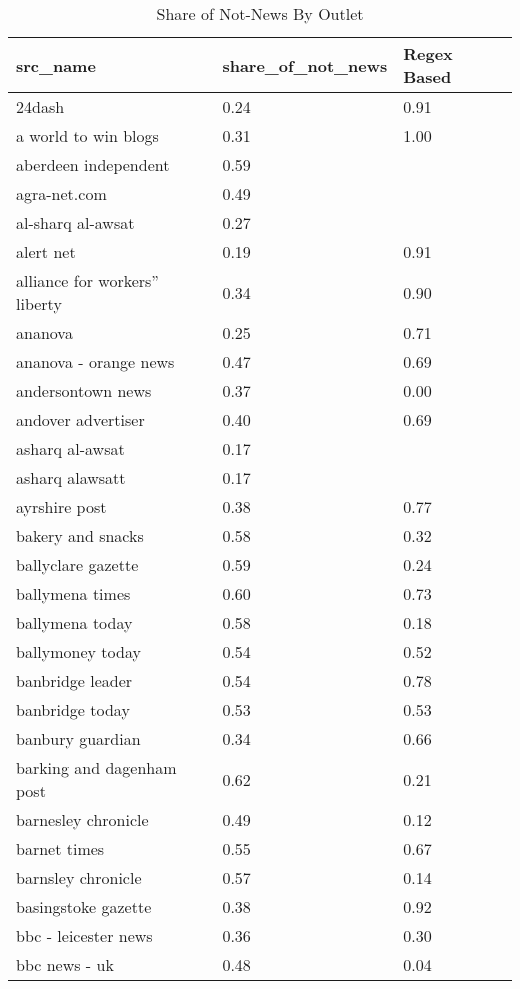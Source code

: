 \begingroup\tiny
\begin{longtable}{p{}p{}p{}}
\caption{Share of Not-News By Outlet} \\ 
  \hline
src_name & share_of_not_news & Regex Based \\ 
  \hline
24dash & 0.24 & 0.91 \\ 
  a world to win blogs & 0.31 & 1.00 \\ 
  aberdeen independent & 0.59 &  \\ 
  agra-net.com & 0.49 &  \\ 
  al-sharq al-awsat & 0.27 &  \\ 
  alert net & 0.19 & 0.91 \\ 
  alliance for workers'' liberty & 0.34 & 0.90 \\ 
  ananova & 0.25 & 0.71 \\ 
  ananova - orange news & 0.47 & 0.69 \\ 
  andersontown news & 0.37 & 0.00 \\ 
  andover advertiser & 0.40 & 0.69 \\ 
  asharq al-awsat & 0.17 &  \\ 
  asharq alawsatt & 0.17 &  \\ 
  ayrshire post & 0.38 & 0.77 \\ 
  bakery and snacks & 0.58 & 0.32 \\ 
  ballyclare gazette & 0.59 & 0.24 \\ 
  ballymena times & 0.60 & 0.73 \\ 
  ballymena today & 0.58 & 0.18 \\ 
  ballymoney today & 0.54 & 0.52 \\ 
  banbridge leader & 0.54 & 0.78 \\ 
  banbridge today & 0.53 & 0.53 \\ 
  banbury guardian & 0.34 & 0.66 \\ 
  barking and dagenham post & 0.62 & 0.21 \\ 
  barnesley chronicle & 0.49 & 0.12 \\ 
  barnet times & 0.55 & 0.67 \\ 
  barnsley chronicle & 0.57 & 0.14 \\ 
  basingstoke gazette & 0.38 & 0.92 \\ 
  bbc - leicester news & 0.36 & 0.30 \\ 
  bbc news - uk & 0.48 & 0.04 \\ 

\end{longtable}
